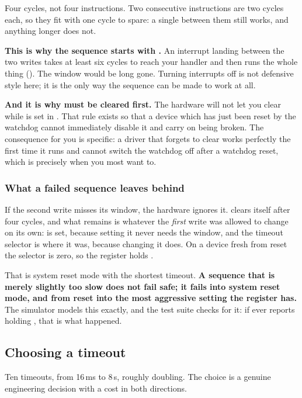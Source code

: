 Four cycles, not four instructions. Two consecutive  instructions are two cycles each,
so they fit with one cycle to spare: a single  between them still works, and anything
longer does not.

\textbf{This is why the sequence starts with .} An interrupt landing between the two
writes takes at least six cycles to reach your handler and then runs the whole thing
(). The window would be long gone. Turning interrupts off is not defensive
style here; it is the only way the sequence can be made to work at all.

\textbf{And it is why  must be cleared first.} The hardware will not let you clear
 while  is set in . That rule exists so that a device which has
just been reset by the watchdog cannot immediately disable it and carry on being broken. The
consequence for you is specific: a driver that forgets to clear  works perfectly the
first time it runs and cannot switch the watchdog off after a watchdog reset, which is precisely
when you most want to.

\subsubsection{What a failed sequence leaves behind}
If the second write misses its window, the hardware ignores it.  clears itself after
four cycles, and what remains is whatever the \emph{first} write was allowed to change on its own:
 is set, because setting it never needs the window, and the timeout selector is where it
was, because changing it does. On a device fresh from reset the selector is zero, so the register
holds .

That is system reset mode with the shortest timeout. \textbf{A sequence that is merely slightly
too slow does not fail safe; it fails into system reset mode, and from reset into the most
aggressive setting the register has.} The simulator models this exactly, and the test suite checks
for it: if  ever reports  holding
, that is what happened.

\subsection{Choosing a timeout}
\label{c6:sec:timeout}
Ten timeouts, from 16\,ms to 8\,s, roughly doubling. The choice is a genuine engineering decision
with a cost in both directions.

